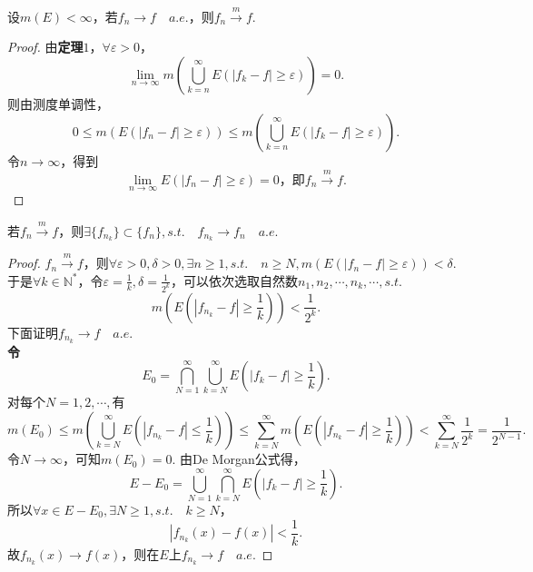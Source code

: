 \documentclass[bwprint, withoutpreface]{cumcmthesis}
\begin{document}
\begin{theorem}
	设$m(E) < \infty$，若$f_n \to f \quad a.e.$，则$f_n \stackrel{m}{\longrightarrow} f$.
\end{theorem}

\begin{proof}
	由\textbf{定理$1$}，$\forall \varepsilon > 0$，
	\begin{equation*}
		\lim_{n \to \infty}{m(\bigcup_{k = n}^{\infty}{E(|f_k - f| \geqslant \varepsilon)})} = 0.
	\end{equation*}
	则由测度单调性，
	\begin{equation*}
		0 \leqslant m(E(|f_n - f| \geqslant \varepsilon)) \leqslant m(\bigcup_{k = n}^{\infty}{E(|f_k - f| \geqslant \varepsilon)}).
	\end{equation*}
	令$n \to \infty$，得到\[\lim_{n \to \infty}{E(|f_n - f| \geqslant \varepsilon)} = 0 \mbox{，即} f_n \stackrel{m}{\longrightarrow} f.\]
\end{proof}

\begin{theorem}[Risez定理]
	若$f_n \stackrel{m}{\longrightarrow} f$，则$\exists \{f_{n_k}\} \subset \{f_n\}, s.t. \quad f_{n_k} \to f_n \quad a.e.$
\end{theorem}

\begin{proof}
	$f_n \stackrel{m}{\longrightarrow} f$，则$\forall \varepsilon > 0, \delta > 0, \exists n \geqslant 1, s.t. \quad n \geqslant N, m(E(|f_n - f| \geqslant \varepsilon)) < \delta$.
	于是$\forall k \in \mathbb{N}^*$，令$\varepsilon = \frac{1}{k}, \delta = \frac{1}{2^k}$，可以依次选取自然数$n_1, n_2, \cdots, n_k, \cdots, s.t.$
	\begin{equation*}
		m(E(|f_{n_k} - f| \geqslant \frac{1}{k})) < \frac{1}{2^k}.
	\end{equation*}
	下面证明$f_{n_k} \to f \quad a.e.$ \\
	\textbf{令\[E_0 = \bigcap_{N = 1}^{\infty}{\bigcup_{k = N}^{\infty}{E(|f_k - f| \geqslant \frac{1}{k})}}.\]}
	对每个$N = 1, 2, \cdots, $有
	\begin{equation*}
		m(E_0) \leqslant m(\bigcup_{k = N}^{\infty}{E(|f_{n_k} - f| \leqslant \frac{1}{k})}) \leqslant \sum_{k = N}^{\infty}{m(E(|f_{n_k} - f| \geqslant \frac{1}{k}))} < \sum_{k = N}^{\infty}{\frac{1}{2^k}} = \frac{1}{2^{N - 1}}.
	\end{equation*}
	令$N \to \infty$，可知$m(E_0) = 0$.
	由De Morgan公式得，
	\begin{equation*}
		E - E_0 = \bigcup_{N = 1}^{\infty}{\bigcap_{k = N}^{\infty}{E(|f_k - f| \geqslant \frac{1}{k})}}.
	\end{equation*}
	所以$\forall x \in E - E_0, \exists N \geqslant 1, s.t. \quad k \geqslant N$，
	\begin{equation*}
		|f_{n_k}(x) - f(x)| < \frac{1}{k}.
	\end{equation*}
	故$f_{n_k}(x) \to f(x)$，则在$E$上$f_{n_k} \to f \quad a.e.$
\end{proof}
\end{document}
